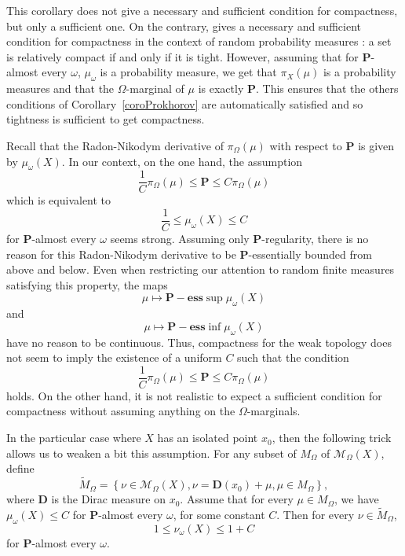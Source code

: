 \documentclass{amsart}
\theoremstyle{definition}
\theoremstyle{remark}
\begin{document}
This corollary does not give a necessary and sufficient condition for compactness, but only a sufficient one.
On the contrary, \cite[Theorem~4.4]{Crauel} gives a necessary and sufficient condition for compactness in the context of random probability measures : a set is relatively compact if and only if it is tight.
However, assuming that for $\mathbf P$-almost every $\omega$, $\mu_\omega$ is a probability measure, we get that $\pi_X(\mu)$ is a probability measures and that the $\Omega$-marginal of $\mu$ is exactly $\mathbf P$.
This ensures that the others conditions of Corollary~\ref{coroProkhorov} are automatically satisfied and so tightness is sufficient to get compactness.

Recall that the Radon-Nikodym derivative of $\pi_\Omega(\mu)$ with respect to $\mathbf P$ is given by $\mu_\omega(X)$.
In our context, on the one hand, the assumption
$$\frac{1}{C}\pi_\Omega(\mu)\leq \mathbf P\leq C\pi_\Omega(\mu)$$
which is equivalent to
$$\frac{1}{C}\leq \mu_\omega(X)\leq C$$
for $\mathbf P$-almost every $\omega$
seems strong.
Assuming only $\mathbf P$-regularity, there is no reason for this Radon-Nikodym derivative to be $\mathbf P$-essentially bounded from above and below.
Even when restricting our attention to random finite measures satisfying this property, the maps
$$\mu\mapsto \mathbf P-\textbf{ess}\sup \mu_\omega(X)$$
and
$$\mu\mapsto \mathbf P-\textbf{ess}\inf \mu_\omega(X)$$
have no reason to be continuous.
Thus, compactness for the weak topology does not seem to imply the existence of a uniform $C$ such that the condition 
$$\frac{1}{C}\pi_\Omega(\mu)\leq \mathbf P\leq C\pi_\Omega(\mu)$$
holds.
On the other hand, it is not realistic to expect a sufficient condition for compactness without assuming anything on the $\Omega$-marginals.

\medskip
In the particular case where $X$ has an isolated point $x_0$, then the following trick allows us to weaken a bit this assumption.
For any subset of $M_\Omega$ of $\mathcal{M}_\Omega(X)$, define
$$\widetilde{M}_\Omega=\left \{\nu\in \mathcal{M}_\Omega(X), \nu=\mathbf D(x_0)+\mu,\mu\in M_\Omega\right \},$$
where $\mathbf D$ is the Dirac measure on $x_0$.
Assume that for every $\mu\in M_\Omega$, we have $\mu_\omega(X)\leq C$ for $\mathbf P$-almost every $\omega$, for some constant $C$.
Then for every $\nu\in \widetilde{M}_\Omega$,
\begin{equation}\label{coboundedMtilde}
1\leq \nu_\omega(X)\leq 1+C
\end{equation}
for $\mathbf P$-almost every $\omega$.
\end{document}
